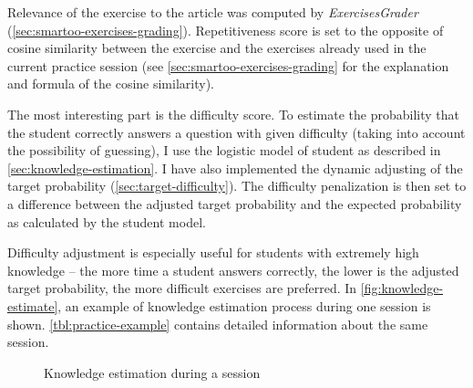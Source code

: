 \documentclass[12pt, twoside]{fithesis2}
\renewcommand{\_}{\leavevmode \kern0.07em\vbox{\hrule width0.4em}}
\begin{document}
Relevance of the exercise to the article was computed by \textit{ExercisesGrader}
(\autoref{sec:smartoo-exercises-grading}).
Repetitiveness score is set to the opposite of cosine similarity between the exercise and the exercises already used in the current practice session
(see \autoref{sec:smartoo-exercises-grading} for the explanation and formula of the cosine similarity).

The most interesting part is the difficulty score.
To estimate the probability that the student correctly answers a question with given difficulty (taking into account the possibility of guessing),
I use the logistic model of student as described in \autoref{sec:knowledge-estimation}.
I have also implemented the dynamic adjusting of the target probability (\autoref{sec:target-difficulty}).
The difficulty penalization is then set to a difference between the adjusted target probability and the expected probability as calculated by the student model.

Difficulty adjustment is especially useful for students with extremely high knowledge -- the more time a student answers correctly, the lower is the adjusted target probability, the more difficult exercises are preferred.
In \autoref{fig:knowledge-estimate}, an example of knowledge estimation process during one session is shown.
\autoref{tbl:practice-example} contains detailed information about the same session.

\begin{figure}[h]
\centering
{}
  \caption{Knowledge estimation during a session}
  \label{fig:knowledge-estimate}
\end{figure}
\end{document}
